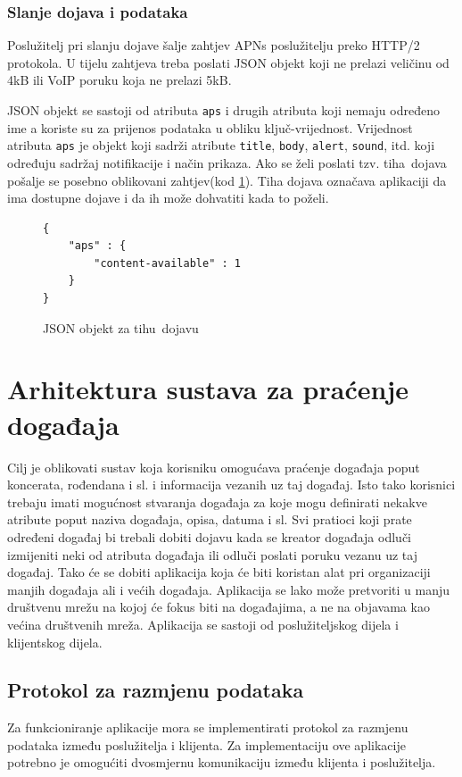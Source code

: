 \documentclass[times, utf8, zavrsni]{fer}
\begin{document}
{\subsection{Slanje dojava i podataka}
Poslužitelj pri slanju dojave šalje zahtjev APNs poslužitelju preko HTTP/2 protokola. U tijelu zahtjeva treba poslati JSON objekt koji ne prelazi veličinu od 4kB ili VoIP poruku koja ne prelazi 5kB.

JSON objekt se sastoji od atributa {\tt aps} i drugih atributa koji nemaju određeno ime a koriste su za prijenos podataka u obliku ključ-vrijednost. Vrijednost atributa {\tt aps} je objekt koji sadrži atribute {\tt title}, {\tt body}, {\tt alert}, {\tt sound}, itd. koji određuju sadržaj notifikacije i način prikaza. Ako se želi poslati tzv. \glqq tiha\grqq\  dojava pošalje se posebno oblikovani zahtjev(kod \ref{lst:tiha-dojava}). Tiha dojava označava aplikaciji da ima dostupne dojave i da ih može dohvatiti kada to poželi.\citep{apns2017}

\begin{figure}[t!]
\begin{lstlisting}
{
    "aps" : {
        "content-available" : 1
    }
}
\end{lstlisting}
\caption{JSON objekt za \glqq tihu\grqq\  dojavu}
\label{lst:tiha-dojava}
\end{figure}

\chapter{Arhitektura sustava za praćenje događaja}
\label{chp:architecture}

Cilj je oblikovati sustav koja korisniku omogućava praćenje događaja poput koncerata, rođendana i sl. i informacija vezanih uz taj događaj. Isto tako korisnici trebaju imati mogućnost stvaranja događaja za koje mogu definirati nekakve atribute poput naziva događaja, opisa, datuma i sl. Svi pratioci koji prate određeni događaj bi trebali dobiti dojavu kada se kreator događaja odluči izmijeniti neki od atributa događaja ili odluči poslati poruku vezanu uz taj događaj. Tako će se dobiti aplikacija koja će biti koristan alat pri organizaciji manjih događaja ali i većih događaja. Aplikacija se lako može pretvoriti u manju društvenu mrežu na kojoj će fokus biti na događajima, a ne na objavama kao većina društvenih mreža. Aplikacija se sastoji od poslužiteljskog dijela i klijentskog dijela.

\section{Protokol za razmjenu podataka}
Za funkcioniranje aplikacije mora se implementirati protokol za razmjenu podataka između poslužitelja i klijenta. Za implementaciju ove aplikacije potrebno je omogućiti dvosmjernu komunikaciju između klijenta i poslužitelja.

}
\end{document}
